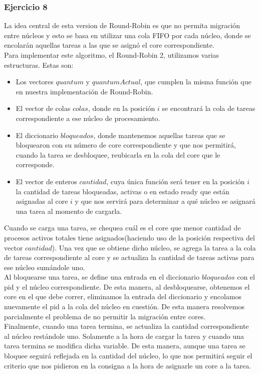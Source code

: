 \subsubsection[]{Ejercicio 8}
\indent \indent La idea central de esta version de Round-Robin es que no permita migración entre núcleos y esto se basa en utilizar una cola FIFO por cada núcleo, donde se encolarán aquellas tareas a las que se asignó el core correspondiente. \\ 
\indent Para implementar este algoritmo, el Round-Robin 2, utilizamos varias estructuras. Estas son:\\
\begin{itemize}
\item Los vectores $quantum$ y $quantumActual$, que cumplen la misma función que en nuestra implementación de Round-Robin.\\
\item El vector de colas $colas$, donde en la posición $i$ se encontrará la cola de tareas correspondiente a ese núcleo de procesamiento.\\
\item El diccionario $bloqueados$, donde mantenemos aquellas tareas que se bloquearon con su número de core correspondiente y que nos permitirá, cuando la tarea se desbloquee, reubicarla en la cola del core que le corresponde.\\ 
\item El vector de enteros $cantidad$, cuya única función será tener en la posición $i$ la cantidad de tareas bloqueadas, activas o en estado ready que están asignadas al core $i$ y que nos servirá para determinar a qué núcleo se asignará una tarea al momento de cargarla.\\
\end{itemize}

\indent \indent Cuando se carga una tarea, se chequea cuál es el core que menor cantidad de procesos activos totales tiene asignados(haciendo uso de la posición respectiva del vector $cantidad$). Una vez que se obtiene dicho núcleo, se agrega la tarea a la cola de tareas correspondiente al core y se actualiza la cantidad de tareas activas para ese núcleo sumándole uno.\\
\indent \indent Al bloquearse una tarea, se define una entrada en el diccionario $bloqueados$ con el pid y el núcleo correspondiente. De esta manera, al desbloquearse, obtenemos el core en el que debe correr, eliminamos la entrada del diccionario y encolamos nuevamente el pid a la cola del núcleo en cuestión. De esta manera resolvemos parcialmente el problema de no permitir la migración entre cores.\\
\indent \indent Finalmente, cuando una tarea termina, se actualiza la cantidad correspondiente al núcleo restándole uno. Solamente a la hora de cargar la tarea y cuando una tarea termina se modifica dicha variable. De esta manera, aunque una tarea se bloquee seguirá reflejada en la cantidad del núcleo, lo que nos permitirá seguir el criterio que nos pidieron en la consigna a la hora de asignarle un core a la tarea.\\


